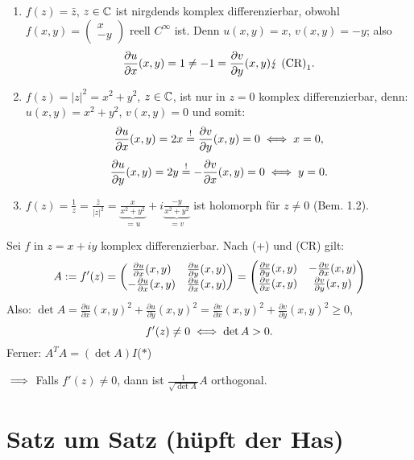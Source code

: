 \documentclass[a4paper,twoside,DIV15,BCOR12mm]{scrbook}
\newcommand{\cmplx}[2]{\left(\!\!\!\begin{array}{c}#1\\#2\end{array}\!\!\!\right)}
\begin{document}
\begin{bsp}
\begin{enumerate}
\item $f(z) = \bar{z}$, $z\in\mathbb{C}$ ist nirgdends komplex differenzierbar, obwohl $f(x,y) = \cmplx{x}{-y}$ reell $C^\infty$ ist. Denn $u(x,y) = x$, $v(x,y) = -y$; also 
\[\frac{\partial u}{\partial x}(x,y) = 1 \neq -1 = \frac{\partial v}{\partial y}(x,y) \lightning\text{ (CR)}_1.\]
\item $f(z) = |z|^2 = x^2 + y^2$, $z\in\mathbb{C}$, ist nur in $z=0$ komplex differenzierbar, denn: $u(x,y) = x^2+y^2$, $v(x,y) = 0$ und somit:
\[\frac{\partial u}{\partial x}(x,y) = 2x \stackrel{!}{=} \frac{\partial v}{\partial y}(x,y) = 0 \iff x=0,\]
\[\frac{\partial u}{\partial y}(x,y) = 2y \stackrel{!}{=} -\frac{\partial v}{\partial x}(x,y) = 0 \iff y=0.\]
\item $\displaystyle f(z) = \frac{1}{z} = \frac{\bar{z}}{|z|^2} = \underbrace{\frac{x}{x^2+y^2}}_{=u} + i\underbrace{\frac{-y}{x^2+y^2}}_{=v}$ ist holomorph für $z\neq 0$ (Bem. 1.2). %
\end{enumerate}
\end{bsp}

\begin{bem} Sei $f$ in $z = x+iy$ komplex differenzierbar. Nach (+) und (CR) gilt:
\begin{equation}
A \da f'(z) = \left(\!\!\!\begin{array}{c c}\frac{\partial u}{\partial x}(x,y)&\frac{\partial u}{\partial y}(x,y)\\-\frac{\partial u}{\partial x}(x,y)&\frac{\partial u}{\partial x}(x,y)\end{array}\!\!\!\right) = \left(\!\!\!\begin{array}{c c}\frac{\partial v}{\partial y}(x,y)&-\frac{\partial v}{\partial x}(x,y)\\\frac{\partial v}{\partial x}(x,y)&\frac{\partial v}{\partial y}(x,y)\end{array}\!\!\!\right)
\end{equation}
Also: $\displaystyle \det A = \frac{\partial u}{\partial x}(x,y)^2 + \frac{\partial u}{\partial y}(x,y)^2 = \frac{\partial v}{\partial x}(x,y)^2 + \frac{\partial v}{\partial y}(x,y)^2 \geq 0$,
\[f'(z) \neq 0 \iff \det A > 0.\]
Ferner: $A^TA = (\det A)I$\hfill($\ast$)

\noindent$\implies$ Falls $f'(z) \neq 0$, dann ist $\frac{1}{\sqrt{\det A}}A$ orthogonal.
\end{bem}
\chapter{Satz um Satz (hüpft der Has)}

\renewcommand{\indexname}{Stichwortverzeichnis}
\printindex
\end{document}
